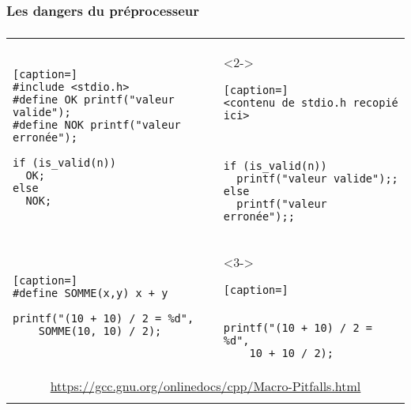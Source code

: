 \subsubsection{Les dangers du préprocesseur}
\begin{frame}[fragile]
\frametitle{\insertsubsubsection}
\begin{center}
\begin{tabular}{p{5.5cm} p{5.5cm}}
\begin{lstlisting}[caption=]
#include <stdio.h>
#define OK printf("valeur valide");
#define NOK printf("valeur erronée");

if (is_valid(n))
  OK;
else
  NOK;
\end{lstlisting} & 
\begin{onlyenv}<2->
\begin{lstlisting}[caption=]
<contenu de stdio.h recopié ici>



if (is_valid(n))
  printf("valeur valide");;
else
  printf("valeur erronée");;

\end{lstlisting}
\end{onlyenv} \\
\begin{lstlisting}[caption=]
#define SOMME(x,y) x + y

printf("(10 + 10) / 2 = %d", 
    SOMME(10, 10) / 2);
\end{lstlisting} &
\begin{onlyenv}<3->
\begin{lstlisting}[caption=]


printf("(10 + 10) / 2 = %d", 
    10 + 10 / 2);
\end{lstlisting}
\end{onlyenv}
\onslide<4->{\\
\multicolumn{2}{c}{ \url{https://gcc.gnu.org/onlinedocs/cpp/Macro-Pitfalls.html} }
\\
}

\end{tabular}
\end{center}
\end{frame}

